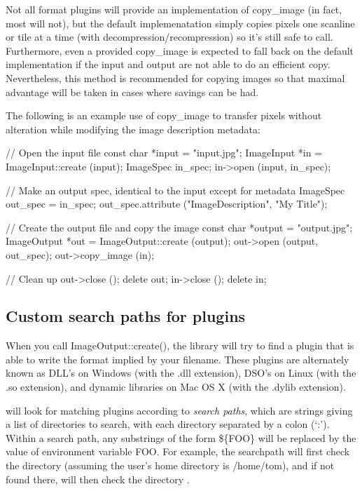 Not all format plugins will provide an implementation of {\cf
  copy_image} (in fact, most will not), but the default implemenatation
simply copies pixels one scanline or tile at a time (with
decompression/recompression) so it's still safe to call.  Furthermore,
even a provided {\cf copy_image} is expected to fall back on the default
implementation if the input and output are not able to do an efficient
copy.  Nevertheless, this method is recommended
for copying images so that maximal advantage will be taken in cases
where savings can be had.

The following is an example use of {\cf copy_image} to transfer pixels
without alteration while modifying the image description metadata:

\begin{code}
    // Open the input file
    const char *input = "input.jpg";
    ImageInput *in = ImageInput::create (input);
    ImageSpec in_spec;
    in->open (input, in_spec);

    // Make an output spec, identical to the input except for metadata
    ImageSpec out_spec = in_spec;
    out_spec.attribute ("ImageDescription", "My Title");

    // Create the output file and copy the image
    const char *output = "output.jpg";
    ImageOutput *out = ImageOutput::create (output);
    out->open (output, out_spec);
    out->copy_image (in);

    // Clean up
    out->close ();
    delete out;
    in->close ();
    delete in;
\end{code}


\subsection{Custom search paths for plugins}
\label{sec:imageoutput:searchpaths}

When you call {\cf ImageOutput::create()}, the \product library will try
to find a plugin that is able to write the format implied by your
filename.  These plugins are alternately known as DLL's on Windows (with
the {\cf .dll} extension), DSO's on Linux (with the {\cf .so}
extension), and dynamic libraries on Mac OS X (with the {\cf .dylib}
extension).  

\product will look for matching plugins according to
\emph{search paths}, which are strings giving a list of directories to
search, with each directory separated by a colon (`{\cf :}').  Within
a search path, any
substrings of the form {\cf \$\{FOO\}} will be replaced
by the value of environment variable {\cf FOO}.  For
example, the searchpath 
will first check the directory  (assuming the
user's home directory is {\cf /home/tom}), and if not
found there, will then check the directory .

